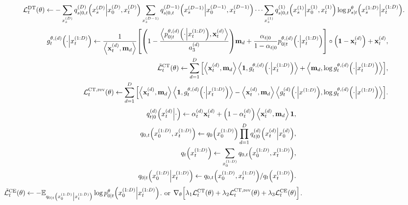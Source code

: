 \documentclass[10pt]{article}
\begin{document}
\begin{algorithm}
\begin{algorithmic}
    \State
    {\color{red}
    \begin{eqnarray*}
      \mathcal{L}^\text{DT}_t(\theta)\gets - \sum_{x_s^{(D)}}q^{(D)}_{s|0,t}\qty(x_s^{(D)}\middle|x_0^{(D)}, x_t^{(D)})\sum_{x_s^{(D-1)}}q^{(D-1)}_{s|0,t}\qty(x_s^{(D-1)}\middle|x_0^{(D-1)}, x_t^{(D-1)})\cdots\sum_{x_s^{(1)}} q^{(1)}_{s|0,t}\qty(x_s^{(1)}\middle|x_0^{(1)}, x_t^{(1)})\log p^\theta_{s|t}\qty(x_s^{(1:D)}\middle|x_t^{(1:D)}).
    \end{eqnarray*}
    }
    \State
    {\color{blue}
    \begin{eqnarray*}
      && g^{\theta,(d)}_t\qty(\cdot\middle|x^{(1:D)}_t)\gets \frac{1}{\left\langle \mathbf{x}^{(d)}_t,\mathbf{m}_d\right\rangle}\qty[\qty(1-\frac{\left\langle p^{\theta,(d)}_{0|t}\qty(\cdot\middle|x^{(1:D)}_t),\mathbf{x}^{(d)}_t\right\rangle}{a^{(d)}_3})\mathbf{m}_d + \frac{\alpha_{t|0}}{1-\alpha_{t|0}}p^{\theta,(d)}_{0|t}\qty(\cdot\middle|x^{(1:D)}_t)]\circ \qty(\mathbf{1}-\mathbf{x}^{(d)}_t) + \mathbf{x}^{(d)}_t, \\
      && \tilde{\mathcal{L}}^\text{CT}_t(\theta)\gets \sum_{d=1}^D\qty[\left\langle\mathbf{x}^{(d)}_t,\mathbf{m}_d\right\rangle\left\langle\mathbf{1},g^{\theta,(d)}_t\qty(\cdot\middle|x^{(1:D)}_t)\right\rangle + \left\langle \mathbf{m}_d,\log g^{\theta,(d)}_t\qty(\cdot\middle|x^{(1:D)}_t)\right\rangle], \\
      && \mathcal{L}^\text{CT,rev}_t(\theta) \gets \sum_{d=1}^D\qty[ \left\langle\mathbf{x}^{(d)}_t,\mathbf{m}_d\right\rangle\left\langle\mathbf{1},g^{\theta,(d)}_t\qty(\cdot\middle|x^{(1:D)}_t)\right\rangle - \left\langle\mathbf{x}^{(d)}_t, \mathbf{m}_d\right\rangle \left\langle g_t^{(d)}\qty(\cdot \middle|x^{(1:D)}), \log g_t^{\theta, (d)}\qty(\cdot \middle|x^{(1:D)}) \right\rangle ].
    \end{eqnarray*}
    }
    \State
    \begin{eqnarray*}
      &&q^{(d)}_{t|0}\qty(x^{(d)}_t\middle|\cdot) \gets \alpha^{(d)}_t \mathbf{x}^{(d)}_t + \qty(1 - \alpha^{(d)}_t)\left\langle\mathbf{x}^{(d)}_t, \mathbf{m}_d\right\rangle\mathbf{1},\\
      &&q_{0,t}\qty(x^{(1:D)}_0, x^{(1:D)}_t) \gets q_0\qty(x^{(1:D)}_0)\prod_{d=1}^D q^{(d)}_{t|0}\qty(x^{(d)}_t\middle|x^{(d)}_0),\\
      &&q_t\qty(x^{(1:D)}_t) \gets \sum_{x^{(1:D)}_0}q_{0,t}\qty(x^{(1:D)}_0, x^{(1:D)}_t),\\
      &&q_{0|t}\qty(x^{(1:D)}_0\middle|x^{(1:D)}_t) \gets q_{0,t}\qty(x^{(1:D)}_0, x^{(1:D)}_t) / q_t\qty(x^{(1:D)}_t).
    \end{eqnarray*}
    \State $\tilde{\mathcal{L}}^\text{CE}_t(\theta)\gets -\mathbb{E}_{q_{0|t}\qty(x^{(1:D)}_0\middle|x^{(1:D)}_t)}\log p^\theta_{0|t}\qty(x^{(1:D)}_0\middle|x^{(1:D)}_t)$.
     or {\color{blue} $\nabla_\theta\qty[\lambda_1 \mathcal{L}^\text{CT}_t(\theta) + \lambda_2 \mathcal{L}^\text{CT,rev}_t(\theta) + \lambda_3 \mathcal{L}^\text{CE}_t(\theta)]$}.
  \end{algorithmic}
\end{algorithm}
\end{document}
